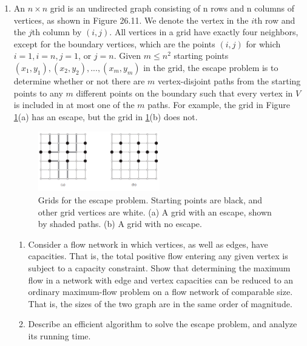 \documentclass[12pt,a4paper]{article}
\theoremstyle{definition}
\begin{document}
\begin{enumerate}
	\item An $n\times n$ grid is an undirected graph consisting of n rows and n columns of vertices, as shown in Figure 26.11. We denote the vertex in the $i$th row and the $j$th column by $(i,j)$. All vertices in a grid have exactly four neighbors, except for the boundary vertices, which are the points $(i,j)$ for which $i = 1, i = n, j = 1$, or $j = n$.
    Given $m\leqslant n^2$ starting points $(x_1,y_1), (x_2, y_2), ... , (x_m, y_m)$ in the grid, the escape problem is to determine whether or not there are $m$ vertex-disjoint paths from the starting points to any $m$ different points on the boundary such that every vertex in $V$ is included in at most one of the $m$ paths. For example, the grid in Figure \ref{Fig-EscapeProblem}(a) has an escape, but the grid in \ref{Fig-EscapeProblem}(b) does not.
    \begin{figure}[!htbp]
	\centering
	\includegraphics[width=0.5\textwidth]{Fig-EscapeProblem.pdf}
	\caption{Grids for the escape problem. Starting points are black, and other grid vertices are white. (a) A grid with an escape, shown by shaded paths. (b) A grid with no escape.}
	\label{Fig-EscapeProblem}
	\end{figure}
    \begin{enumerate}
        \item Consider a flow network in which vertices, as well as edges, have capacities. That is, the total positive flow entering any given vertex is subject to a capacity constraint. Show that determining the maximum flow in a network with edge and vertex capacities can be reduced to an ordinary maximum-flow problem on a flow network of comparable size. That is, the sizes of the two graph are in the same order of magnitude.
        \item Describe an efficient algorithm to solve the escape problem, and analyze its running time.
    \end{enumerate}


\end{enumerate}
\end{document}
